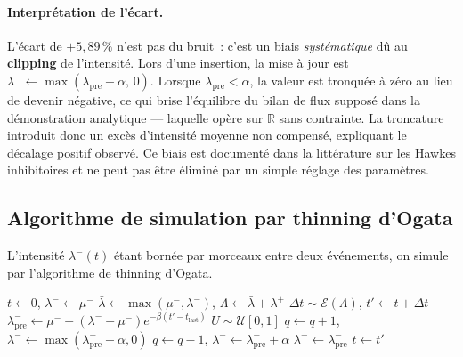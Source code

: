 \documentclass[11pt,a4paper]{article}
\theoremstyle{definition}
\begin{document}
\begin{demonstration}
\paragraph{Interprétation de l'écart.}\leavevmode
\begin{resultatnegatif}[title={Biais de troncature inhérent au thinning inhibitoire}]
L'écart de $+5{,}89\,\%$ n'est pas du bruit~: c'est un biais \emph{systématique}
dû au \textbf{clipping} de l'intensité. Lors d'une insertion, la mise à jour
est $\lambda^-\leftarrow\max(\lambda^-_\mathrm{pre}-\alpha,\,0)$.
Lorsque $\lambda^-_\mathrm{pre}<\alpha$, la valeur est tronquée à zéro au lieu
de devenir négative, ce qui brise l'équilibre du bilan de flux supposé dans
la démonstration analytique — laquelle opère sur $\mathbb{R}$ sans contrainte.
La troncature introduit donc un excès d'intensité moyenne non compensé,
expliquant le décalage positif observé. Ce biais est documenté dans la
littérature sur les Hawkes inhibitoires et ne peut pas être éliminé par
un simple réglage des paramètres.
\end{resultatnegatif}

\end{demonstration}

\subsection{Algorithme de simulation par thinning d'Ogata}

L'intensité $\lambda^-(t)$ étant bornée par morceaux entre deux événements,
on simule par l'algorithme de thinning d'Ogata.

\begin{algorithm}[H]
\caption{Thinning d'Ogata pour le Hawkes individuel}
\begin{algorithmic}[1]
\State $t\gets0$,\; $\lambda^-\gets\mu^-$
  \State $\bar\lambda\gets\max(\mu^-,\lambda^-)$,\;
         $\Lambda\gets\bar\lambda+\lambda^+$
  \State $\Delta t\sim\mathcal{E}(\Lambda)$,\; $t'\gets t+\Delta t$
  \State $\lambda^-_\mathrm{pre}\gets\mu^-+(\lambda^--\mu^-)e^{-\beta(t'-t_\mathrm{last})}$
  \State $U\sim\mathcal{U}[0,1]$
    \State $q\gets q+1$,\;
           $\lambda^-\gets\max(\lambda^-_\mathrm{pre}-\alpha,0)$
    \State $q\gets q-1$,\;
           $\lambda^-\gets\lambda^-_\mathrm{pre}+\alpha$
  \Else\; $\lambda^-\gets\lambda^-_\mathrm{pre}$
  \EndIf
  \State $t\gets t'$
\EndWhile
\end{algorithmic}
\end{algorithm}
\end{document}
